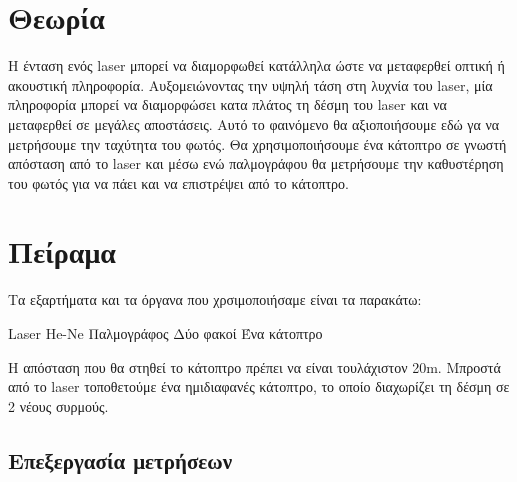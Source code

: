 \documentclass[a4paper,11pt,titlepage]{article}
\begin{document}
\section{Θεωρία}
Η ένταση ενός laser μπορεί να διαμορφωθεί κατάλληλα ώστε να μεταφερθεί οπτική ή
ακουστική πληροφορία. Αυξομειώνοντας την υψηλή τάση στη λυχνία του laser, μία
πληροφορία μπορεί να διαμορφώσει κατα πλάτος τη δέσμη του laser και να
μεταφερθεί σε μεγάλες αποστάσεις. Αυτό το φαινόμενο θα αξιοποιήσουμε εδώ γα να
μετρήσουμε την ταχύτητα του φωτός. Θα χρησιμοποιήσουμε ένα κάτοπτρο σε
γνωστή απόσταση από το laser και μέσω ενώ παλμογράφου θα μετρήσουμε την καθυστέρηση του φωτός για να πάει και
να επιστρέψει από το κάτοπτρο. 

\section{Πείραμα}

Τα εξαρτήματα και τα όργανα που χρσιμοποιήσαμε είναι τα παρακάτω:

Laser He-Ne
Παλμογράφος
Δύο φακοί
Ένα κάτοπτρο

Η απόσταση που θα στηθεί το κάτοπτρο πρέπει να είναι τουλάχιστον 20m. Μπροστά από το laser τοποθετούμε
ένα ημιδιαφανές κάτοπτρο, το οποίο διαχωρίζει τη δέσμη σε 2 νέους συρμούς.  



\subsection{Επεξεργασία μετρήσεων}
\end{document}
